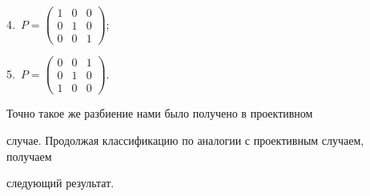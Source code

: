 4.~$P=\left(\begin{smallmatrix} 1 & 0&0\\0 & 1&0\\ 0&0&1


\end{smallmatrix}\right)$;


5.~$P=\left(\begin{smallmatrix} 0 & 0&1\\0 & 1&0\\ 1&0&0


\end{smallmatrix}\right)$.





Точно такое же разбиение нами было получено в проективном


случае. Продолжая классификацию по аналогии с проективным случаем, получаем


следующий результат.





